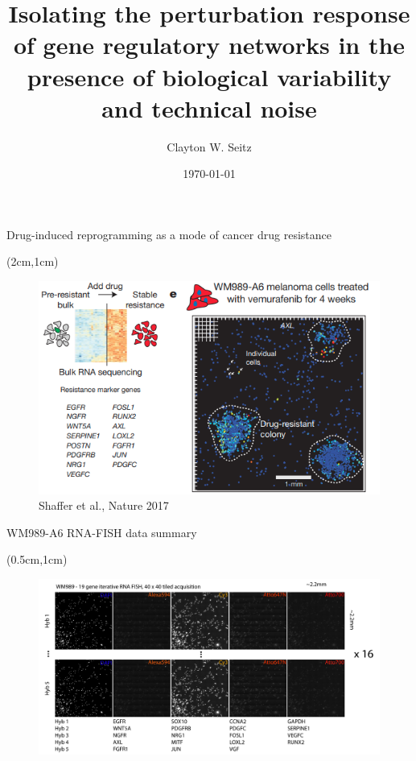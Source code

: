 \documentclass[aspectratio=1610]{beamer}					%
\title{Isolating the perturbation response of gene regulatory networks in the presence of biological variability and technical noise}	%
\author{Clayton W. Seitz}								%
\date{\today}									%
\begin{document}
\begin{frame}
  \titlepage
\end{frame}

%

\begin{frame}{Drug-induced
reprogramming as a mode of cancer drug resistance}

\begin{textblock*}{12cm}(2cm,1cm)
\begin{figure}
\includegraphics[width=12cm]{resistance.png}
\caption{Shaffer et al., Nature 2017}
\end{figure}
\end{textblock*}

\end{frame}

\begin{frame}{WM989-A6 RNA-FISH data summary}

\begin{textblock*}{15cm}(0.5cm,1cm)
\begin{figure}
\includegraphics[width=15cm]{data-summary.png}
\end{figure}
\end{textblock*}

\end{frame}
\end{document}
